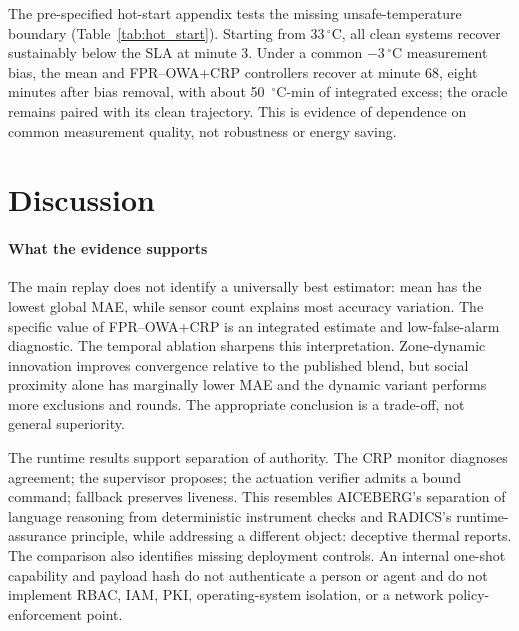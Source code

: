 \documentclass[smartcities,article,submit,moreauthors]{Definitions/mdpi}
\begin{document}


The pre-specified hot-start appendix tests the missing unsafe-temperature
boundary (Table~\ref{tab:hot_start}). Starting from 33\,$^\circ$C, all clean
systems recover sustainably below the SLA at minute 3. Under a common
$-3\,^\circ$C measurement bias, the mean and FPR--OWA+CRP controllers recover
at minute 68, eight minutes after bias removal, with about 50~$^\circ$C-min of
integrated excess; the oracle remains paired with its clean trajectory. This
is evidence of dependence on common measurement quality, not robustness or
energy saving.



\section{Discussion}
\label{sec:discussion}

\paragraph{What the evidence supports}
The main replay does not identify a universally best estimator: mean has the
lowest global MAE, while sensor count explains most accuracy variation. The
specific value of FPR--OWA+CRP is an integrated estimate and low-false-alarm
diagnostic. The temporal ablation sharpens this interpretation. Zone-dynamic
innovation improves convergence relative to the published blend, but social
proximity alone has marginally lower MAE and the dynamic variant performs more
exclusions and rounds. The appropriate conclusion is a trade-off, not general
superiority.

The runtime results support separation of authority. The CRP monitor diagnoses
agreement; the supervisor proposes; the actuation verifier admits a bound
command; fallback preserves liveness. This resembles AICEBERG's separation of
language reasoning from deterministic instrument checks and RADICS's
runtime-assurance principle, while addressing a different object: deceptive
thermal reports. The comparison also identifies missing deployment controls.
An internal one-shot capability and payload hash do not authenticate a person
or agent and do not implement RBAC, IAM, PKI, operating-system isolation, or a
network policy-enforcement point.
\end{document}
